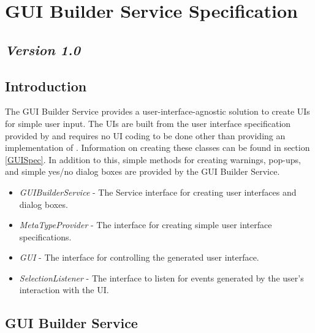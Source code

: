 \chapter{GUI Builder Service Specification}
\section*{\textit{Version 1.0}}
\section{Introduction}

The GUI Builder Service provides a user-interface-agnostic solution to
create UIs for simple user input. The UIs are built from the user interface
specification provided by  and requires no UI coding to
be done other than providing an implementation of .
Information on creating these classes can be found in section \ref{GUISpec}. In
addition to this, simple methods for creating warnings, pop-ups, and
simple yes/no dialog boxes are provided by the GUI Builder Service.


\begin{itemize}
  \item \textit{GUIBuilderService} - The Service interface for creating
  user interfaces and dialog boxes.
  \item \textit{MetaTypeProvider} - The interface for creating simple user
  interface specifications.
  \item \textit{GUI} - The interface for controlling the
   generated user interface.
  \item \textit{SelectionListener} - The interface to listen for events
  generated by the user's interaction with the UI.
\end{itemize}

\section{GUI Builder Service}


\orgcishellserviceguibuilder{}
